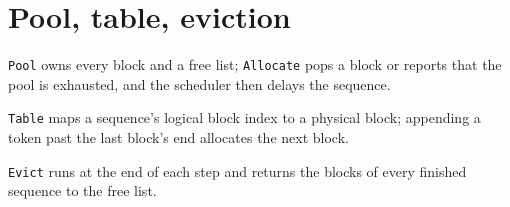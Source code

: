 \section{Pool, table, eviction}
\verb|Pool| owns every block and a free list; \verb|Allocate| pops a block or reports that the pool is exhausted, and the scheduler then delays the sequence.

\verb|Table| maps a sequence's logical block index to a physical block; appending a token past the last block's end allocates the next block.

\verb|Evict| runs at the end of each step and returns the blocks of every finished sequence to the free list.
